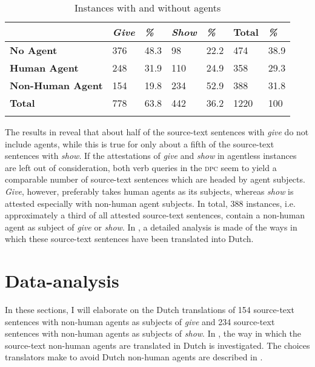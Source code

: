 \documentclass[output=paper]{LSP/langsci}
\begin{document}
\begin{table}
     \centering
     \begin{tabularx}{\textwidth}{XXXXXXX}
     \lsptoprule
                  &  \textit{Give}   & \textit{\%}  & \textit{Show}  & \textit{\%} & Total & \textit{\%} \\ \midrule
       \textbf{No Agent}    & 376    & 48.3          & 98	           & 22.2      & 474   & 38.9 \\
       \textbf{Human Agent} & 248    & 31.9          & 110             & 24.9      & 358   & 29.3  \\
       \textbf{Non-Human Agent} & 154 & 19.8         & 234             & 52.9      & 388   & 31.8 \\  \midrule
       \textbf{Total}       & 778     & 63.8        & 442              & 36.2      & 1220  & 100  \\ 
  \lspbottomrule     
     \end{tabularx}
 
     \caption{Instances with and without agents}
     \label{tab:5.1}
 
   \end{table}

The results in  reveal that about half of the source-text sentences with \textit{give} do not include agents, while this is true for only about a fifth of the source-text sentences with \textit{show}. If the attestations of \textit{give} and \textit{show} in agentless instances are left out of consideration, both verb queries in the \textsc{dpc} seem to yield a comparable number of source-text sentences which are headed by agent subjects. \textit{Give}, however, preferably takes human agents as its subjects, whereas \textit{show} is attested especially with non-human agent subjects. In total, 388 instances, i.e. approximately a third of all attested source-text sentences, contain a non-human agent as subject of \textit{give} or \textit{show}. In , a detailed analysis is made of the ways in which these source-text sentences have been translated into Dutch. 

\section{Data-analysis} \label{sec:5:6}

In these sections, I will elaborate on the Dutch translations of 154 source-text sentences with non-human agents as subjects of \textit{give} and 234 source-text sentences with non-human agents as subjects of \textit{show}. In , the way in which the source-text non-human agents are translated in Dutch is investigated. The choices translators make to avoid Dutch non-human agents are described in .
  
\end{document}
